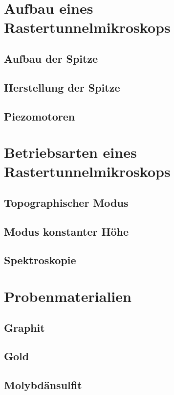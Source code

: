 \section{Aufbau eines Rastertunnelmikroskops}
    \subsection{Aufbau der Spitze}
    \subsection{Herstellung der Spitze}
    \subsection{Piezomotoren}

\section{Betriebsarten eines Rastertunnelmikroskops}
    \subsection{Topographischer Modus}
    \subsection{Modus konstanter Höhe}
    \subsection{Spektroskopie}

\section{Probenmaterialien}
    \subsection{Graphit}
    \subsection{Gold}
    \subsection{Molybdänsulfit}
